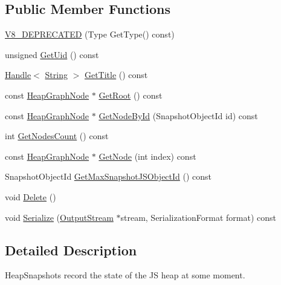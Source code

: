 \subsection*{Public Member Functions}
\begin{DoxyCompactItemize}
\item 
\hyperlink{classv8_1_1_heap_snapshot_a299f6bd66965d96e72845faab8af4c52}{V8\+\_\+\+D\+E\+P\+R\+E\+C\+A\+T\+E\+D} (Type Get\+Type() const)
\item 
unsigned \hyperlink{classv8_1_1_heap_snapshot_a8096d1dc0b99fbffc0f0618be8472ca7}{Get\+Uid} () const 
\item 
\hyperlink{classv8_1_1_handle}{Handle}$<$ \hyperlink{classv8_1_1_string}{String} $>$ \hyperlink{classv8_1_1_heap_snapshot_a54d5d9e0234c2ee361892ea598624a82}{Get\+Title} () const 
\item 
const \hyperlink{classv8_1_1_heap_graph_node}{Heap\+Graph\+Node} $\ast$ \hyperlink{classv8_1_1_heap_snapshot_aafd7abe35ce29f9874de6687c65bf2af}{Get\+Root} () const 
\item 
const \hyperlink{classv8_1_1_heap_graph_node}{Heap\+Graph\+Node} $\ast$ \hyperlink{classv8_1_1_heap_snapshot_a023696f94fe538380922bf2c40c97b7b}{Get\+Node\+By\+Id} (Snapshot\+Object\+Id id) const 
\item 
int \hyperlink{classv8_1_1_heap_snapshot_aaa2182a442eedf26d509cc3ddc623cc5}{Get\+Nodes\+Count} () const 
\item 
const \hyperlink{classv8_1_1_heap_graph_node}{Heap\+Graph\+Node} $\ast$ \hyperlink{classv8_1_1_heap_snapshot_ae67eb5a68dd648516f9d3879137d5c51}{Get\+Node} (int index) const 
\item 
Snapshot\+Object\+Id \hyperlink{classv8_1_1_heap_snapshot_a4a0fc79b7ef74a3a5ea3450b2354d8ed}{Get\+Max\+Snapshot\+J\+S\+Object\+Id} () const 
\item 
void \hyperlink{classv8_1_1_heap_snapshot_aeaa6073009e4041839dff7a860d2548a}{Delete} ()
\item 
void \hyperlink{classv8_1_1_heap_snapshot_acf7383deaa06fab1d948fd7e737ac7d3}{Serialize} (\hyperlink{classv8_1_1_output_stream}{Output\+Stream} $\ast$stream, Serialization\+Format format) const 
\end{DoxyCompactItemize}


\subsection{Detailed Description}
Heap\+Snapshots record the state of the J\+S heap at some moment. 

